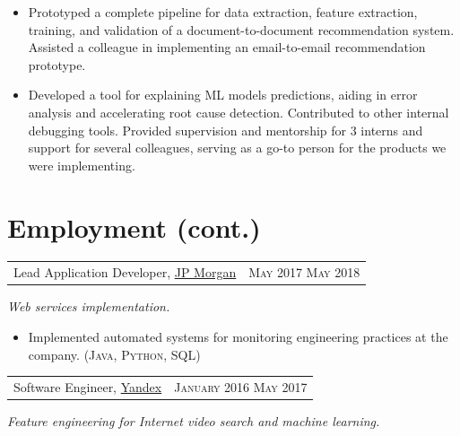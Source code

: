 \documentclass{article}
\makeatletter
\newcommand{\whatwherewhen}[3]{
\noindent\begin{tabular*}{\columnwidth}{@{}@{\extracolsep{\fill}}lr@{}}
#1, #2 & \textsc{#3}
\end{tabular*}}
\newcommand{\smallvskip}{\vskip2mm}
\makeatother
\begin{document}
\begin{itemize}
\begin{itemize}
  \item Prototyped a complete pipeline for data extraction, feature extraction, training, and validation of a document-to-document recommendation system. Assisted a colleague in implementing an email-to-email recommendation prototype.

  \item Developed a tool for explaining ML models predictions, aiding in error analysis and accelerating root cause detection. Contributed to other internal debugging tools. Provided supervision and mentorship for 3 interns and support for several colleagues, serving as a go-to person for the products we were implementing.

  \end{itemize}

\end{itemize}


\newpage

\section{Employment (cont.)}

\smallvskip
\whatwherewhen{Lead Application Developer}{\href{https://www.jpmorganchase.com/}{JP Morgan}}{May 2017 \textendash{} May 2018}

\textit{Web services implementation.}

\begin{itemize}

\item Implemented automated systems for monitoring engineering practices at the company. (\textsc{Java}, \textsc{Python}, \textsc{SQL})

\end{itemize}

\smallvskip
\whatwherewhen{Software Engineer}{\href{https://yandex.com/company/}{Yandex}}{January 2016 \textendash{} May 2017}

\textit{Feature engineering for Internet video search and machine learning.}
\end{document}
